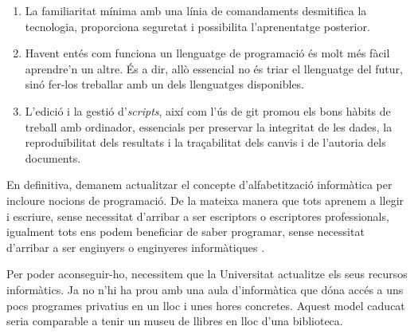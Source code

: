 \documentclass[a4paper,12pt]{article}
\begin{document}
\begin{enumerate}
\item La familiaritat mínima amb una línia de comandaments desmitifica la tecnologia,
proporciona seguretat i possibilita l'aprenentatge posterior.
\item Havent entés com funciona un llenguatge de programació és molt més fàcil aprendre'n un altre.
És a dir, allò essencial no és triar el llenguatge del futur, sinó fer-los treballar amb un dels
llenguatges disponibles.
\item L'edició i la gestió d'\emph{scripts}, així com l'ús de \textsf{git} promou els bons
hàbits de treball amb ordinador, essencials per preservar la integritat de les dades, la
reproduïbilitat dels resultats i la traçabilitat dels canvis i de l'autoria dels documents.
\end{enumerate}

En definitiva, demanem actualitzar el concepte d'alfabetització informàtica per incloure nocions
de programació. De la mateixa manera que tots aprenem a llegir i escriure, sense necessitat
d'arribar a ser escriptors o escriptores professionals, igualment tots ens podem beneficiar
de saber programar, sense necessitat d'arribar a ser enginyers o enginyeres informàtiques
\cite{Vee2017}.

Per poder aconseguir-ho, necessitem que la Universitat actualitze els seus recursos informàtics.
Ja no n'hi ha prou amb una aula d'informàtica que dóna accés a uns pocs programes privatius
en un lloc i unes hores concretes. Aquest model caducat seria comparable a tenir un museu de
llibres en lloc d'una biblioteca.



\end{document}
